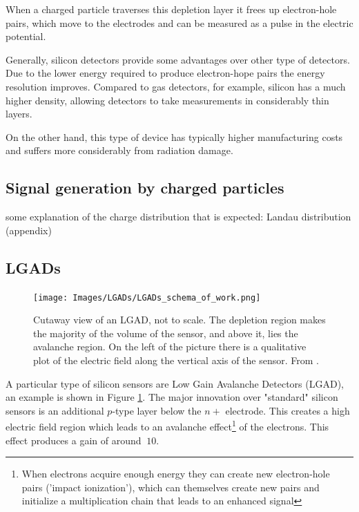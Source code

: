 When a charged particle traverses this depletion layer it frees up electron-hole pairs, which move to the electrodes and can be measured as a pulse in the electric potential.

Generally, silicon detectors provide some advantages over other type of detectors. Due to the lower energy required to produce electron-hope pairs the energy resolution improves. Compared to gas detectors, for example, silicon has a much higher density, allowing detectors to take measurements in considerably thin layers.

On the other hand, this type of device has typically higher manufacturing costs and suffers more considerably from radiation damage.


\subsection{Signal generation by charged particles}

some explanation of the charge distribution that is expected: Landau distribution (appendix)

\subsection{LGADs}

\begin{figure}[!ht]
    \begin{minipage}[c]{.45\linewidth}
        \texttt{[image: Images/LGADs/LGADs\_schema\_of\_work.png]}
    \end{minipage}
    \hfill
    \begin{minipage}[c]{.4\linewidth}
        \caption{Cutaway view of an LGAD, not to scale. The depletion region makes the majority of the volume of the sensor, and above it, lies the avalanche region. On the left of the picture there is a qualitative plot of the electric field along the vertical axis of the sensor. From \cite{cernTechnicalDesign}.}
        \label{fig:LGADs_schema}
    \end{minipage}
\end{figure} 

A particular type of silicon sensors are Low Gain Avalanche Detectors (LGAD), an example is shown in Figure \ref{fig:LGADs_schema}. The major innovation over "standard" silicon sensors is an additional $p$-type layer below the $n+$ electrode. This creates a high electric field region which leads to an avalanche effect\footnote[2]{When electrons acquire enough energy they can create new electron-hole pairs ('impact ionization'), which can themselves create new pairs and initialize a multiplication chain that leads to an enhanced signal} of the electrons. This effect produces a gain of around $~10$.  

